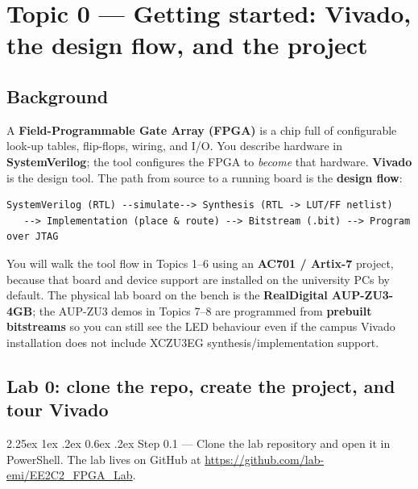 \documentclass[11pt]{article}
\makeatletter
\renewcommand{\_}{\textunderscore\allowbreak}
\renewcommand\paragraph{\@startsection{paragraph}{4}{\z@}%
  {2.25ex \@plus 1ex \@minus .2ex}%
  {0.6ex \@plus .2ex}%
  {\normalfont\normalsize\bfseries}}
\makeatother
\begin{document}

\newpage
\section{Topic 0 --- Getting started: Vivado, the design flow, and the project}

\subsection{Background}
A \textbf{Field-Programmable Gate Array (FPGA)} is a chip full of configurable look-up tables,
flip-flops, wiring, and I/O. You describe hardware in \textbf{SystemVerilog}; the tool configures
the FPGA to \emph{become} that hardware. \textbf{Vivado} is the design tool. The path from source
to a running board is the \textbf{design flow}:

\begin{lstlisting}[style=plain]
SystemVerilog (RTL) --simulate--> Synthesis (RTL -> LUT/FF netlist)
   --> Implementation (place & route) --> Bitstream (.bit) --> Program over JTAG
\end{lstlisting}
You will walk the tool flow in Topics 1--6 using an \textbf{AC701 / Artix-7} project, because that
board and device support are installed on the university PCs by default. The physical lab board on the
bench is the \textbf{RealDigital AUP-ZU3-4GB}; the AUP-ZU3 demos in Topics 7--8 are programmed from
\textbf{prebuilt bitstreams} so you can still see the LED behaviour even if the campus Vivado installation
does not include XCZU3EG synthesis/implementation support.

\subsection{Lab 0: clone the repo, create the project, and tour Vivado}

\paragraph{Step 0.1 --- Clone the lab repository and open it in PowerShell.}
The lab lives on GitHub at \url{https://github.com/lab-emi/EE2C2_FPGA_Lab}.
\end{document}
